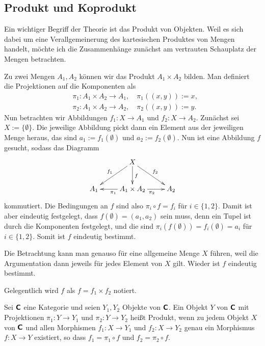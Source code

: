 \subsection{Produkt und Koprodukt}

Ein wichtiger Begriff der Theorie ist das Produkt von
Objekten. Weil es sich dabei um eine Verallgemeinerung des
kartesischen Produktes von Mengen handelt, möchte ich die
Zusammenhänge zunächst am vertrauten Schauplatz der Mengen
betrachten.

Zu zwei Mengen $A_1, A_2$ können wir das Produkt
$A_1\times A_2$ bilden. Man definiert die Projektionen
auf die Komponenten als
\begin{align*}
&\pi_1\colon A_1\times A_2\to A_1,\quad\pi_1((x,y)) := x,\\
&\pi_2\colon A_1\times A_2\to A_2,\quad\pi_2((x,y)) := y.
\end{align*}
Nun betrachten wir Abbildungen $f_1\colon X\to A_1$ und
$f_2\colon X\to A_2$. Zunächst sei $X:=\{\emptyset\}$. Die jeweilige
Abbildung pickt dann ein Element aus der jeweiligen Menge heraus,
das sind $a_1:=f_1(\emptyset)$ und $a_2:=f_2(\emptyset)$. Nun
ist eine Abbildung $f$ gesucht, sodass das Diagramm
\[\xymatrix{
& X\ar[dl]_{f_1}\ar[dr]^{f_2}\ar[d]^f & \\
A_1 & A_1\times A_2 \ar[l]^{\pi_1}\ar[r]_{\pi_2} & A_2
}\]
kommutiert. Die Bedingungen an $f$ sind also
$\pi_i\circ f = f_i$ für $i\in\{1,2\}$. Damit ist aber eindeutig
festgelegt, dass $f(\emptyset)=(a_1,a_2)$ sein muss, denn ein
Tupel ist durch die Komponenten festgelegt, und die sind
$\pi_i(f(\emptyset)) = f_i(\emptyset) = a_i$ für $i\in\{1,2\}$.
Somit ist $f$ eindeutig bestimmt.

Die Betrachtung kann man genauso für eine allgemeine Menge $X$ führen,
weil die Argumentation dann jeweils für jedes Element von $X$ gilt.
Wieder ist $f$ eindeutig bestimmt.

Gelegentlich wird $f$ als $f=f_1\times f_2$ notiert.

\begin{Definition}[Produkt]\newlinefirst
Sei $\textsf{\textbf{C}}$ eine Kategorie und seien $Y_1,Y_2$ Objekte von
$\textsf{\textbf{C}}$. Ein Objekt $Y$ von $\textsf{\textbf{C}}$ mit Projektionen
$\pi_1\colon Y\to Y_1$ und $\pi_2\colon Y\to Y_2$ heißt Produkt, wenn
zu jedem Objekt $X$ von $\textsf{\textbf{C}}$ und allen Morphismen
$f_1\colon X\to Y_1$ und $f_2\colon X\to Y_2$ genau ein Morphismus
$f\colon X\to Y$ existiert, so dass $f_1=\pi_1\circ f$ und
$f_2=\pi_2\circ f$.
\end{Definition}

